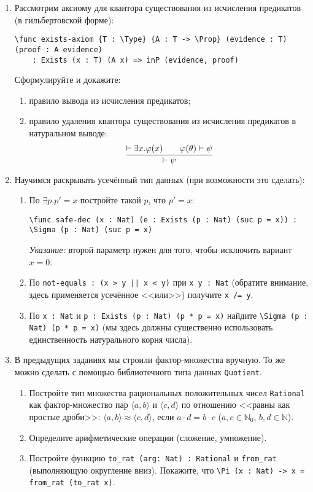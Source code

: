 \documentclass[10pt,a4paper,oneside]{article}
\begin{document}
\begin{enumerate}
\begin{enumerate}
\end{enumerate}

\item Рассмотрим аксиому для квантора существования из исчисления предикатов (в гильбертовской форме):
\begin{verbatim}
\func exists-axiom {T : \Type} {A : T -> \Prop} (evidence : T) (proof : A evidence) 
    : Exists (x : T) (A x) => inP (evidence, proof)
\end{verbatim}

Сформулируйте и докажите:
\begin{enumerate}
\item правило вывода из исчисления предикатов;
\item правило удаления квантора существования из исчисления предикатов в натуральном выводе:
$$\infer{\vdash\psi}{\vdash\exists x.\varphi(x)\quad\quad \varphi(\theta)\vdash\psi}$$
\end{enumerate}

\item Научимся раскрывать усечённый тип данных (при возможности это сделать):
\begin{enumerate}
\item По $\exists p.p' = x$ постройте такой $p$, что $p' = x$: 
\begin{verbatim}\func safe-dec (x : Nat) (e : Exists (p : Nat) (suc p = x)) : \Sigma (p : Nat) (suc p = x)\end{verbatim}
\emph{Указание: } второй параметр нужен для того, чтобы исключить вариант $x = 0$.
\item По \verb!not-equals : (x > y || x < y)! при \verb!x y : Nat! 
(обратите внимание, здесь применяется усечённое <<или>>) получите \verb!x /= y!.
\item По \verb!x : Nat! и \verb!p : Exists (p : Nat) (p * p = x)! найдите
\verb!\Sigma (p : Nat) (p * p = x)! (мы здесь должны существенно использовать единственность натурального корня числа).
\end{enumerate}

\item В предыдущих заданиях мы строили фактор-множества вручную. То же можно сделать с помощью библиотечного типа данных \verb!Quotient!.
\begin{enumerate}
\item Постройте тип множества рациональных положительных чисел \verb!Rational! как фактор-множество пар $\langle a,b \rangle$ и $\langle c,d \rangle$
по отношению <<равны как простые дроби>>:
$\langle a, b \rangle \approx \langle c, d \rangle$, если $a\cdot d = b \cdot c$ ($a,c \in \mathbb{N}_0$, $b,d \in \mathbb{N}$).
\item Определите арифметические операции (сложение, умножение).
\item Постройте функцию \verb!to_rat (arg: Nat) : Rational! и \verb!from_rat! (выполняющую округление вниз). Покажите, что 
\verb!\Pi (x : Nat) -> x = from_rat (to_rat x)!.
\end{enumerate}
\end{enumerate}
\end{document}
